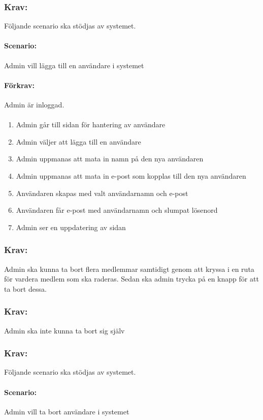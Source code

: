 \documentclass[paper=a4, fontsize=11pt,twoside]{article}
\begin{document}
	\subsubsection*{Krav:} Följande scenario ska stödjas av systemet. 
	\paragraph{Scenario:}
	Admin vill lägga till en användare i systemet
	\paragraph{Förkrav:}
	Admin är inloggad. 
	\paragraph{}
	\begin{enumerate}
		\item Admin går till sidan för hantering av användare
		\item Admin väljer att lägga till en användare
		\item Admin uppmanas att mata in namn på den nya användaren
		\item Admin uppmanas att mata in e-post som kopplas till den nya användaren
		\item Användaren skapas med valt användarnamn och e-post
		\item Användaren får e-post med användarnamn och slumpat lösenord
		\item Admin ser en uppdatering av sidan
	\end{enumerate}
	
	\subsubsection*{Krav:} Admin ska kunna ta bort flera medlemmar samtidigt genom att kryssa i en ruta för vardera medlem som ska raderas. Sedan ska admin trycka på en knapp för att ta bort dessa.
	\subsubsection*{Krav:} Admin ska inte kunna ta bort sig själv
	
	\subsubsection*{Krav:} Följande scenario ska stödjas av systemet. 
	\paragraph{Scenario:}
	Admin vill ta bort användare i systemet
\end{document}
